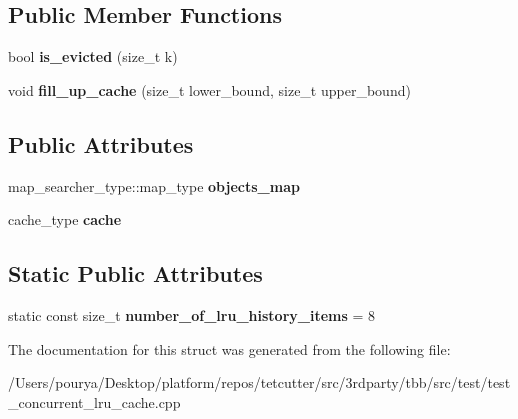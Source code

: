 \subsection*{Public Member Functions}
\begin{DoxyCompactItemize}
\item 
\hypertarget{structserial__tests_1_1usability_1_1filled__instance__counting__fixture__with__external__map_a560c03d85e4dfa7a59f0f4043d92995e}{}bool {\bfseries is\+\_\+evicted} (size\+\_\+t k)\label{structserial__tests_1_1usability_1_1filled__instance__counting__fixture__with__external__map_a560c03d85e4dfa7a59f0f4043d92995e}

\item 
\hypertarget{structserial__tests_1_1usability_1_1filled__instance__counting__fixture__with__external__map_ae0723987b2024cda6e3bf31bc3012bf7}{}void {\bfseries fill\+\_\+up\+\_\+cache} (size\+\_\+t lower\+\_\+bound, size\+\_\+t upper\+\_\+bound)\label{structserial__tests_1_1usability_1_1filled__instance__counting__fixture__with__external__map_ae0723987b2024cda6e3bf31bc3012bf7}

\end{DoxyCompactItemize}
\subsection*{Public Attributes}
\begin{DoxyCompactItemize}
\item 
\hypertarget{structserial__tests_1_1usability_1_1filled__instance__counting__fixture__with__external__map_a8fb4e3a74193224387ab87a3224a1ede}{}map\+\_\+searcher\+\_\+type\+::map\+\_\+type {\bfseries objects\+\_\+map}\label{structserial__tests_1_1usability_1_1filled__instance__counting__fixture__with__external__map_a8fb4e3a74193224387ab87a3224a1ede}

\item 
\hypertarget{structserial__tests_1_1usability_1_1filled__instance__counting__fixture__with__external__map_a1c95856edf4a0c26bf0eb723907b94d7}{}cache\+\_\+type {\bfseries cache}\label{structserial__tests_1_1usability_1_1filled__instance__counting__fixture__with__external__map_a1c95856edf4a0c26bf0eb723907b94d7}

\end{DoxyCompactItemize}
\subsection*{Static Public Attributes}
\begin{DoxyCompactItemize}
\item 
\hypertarget{structserial__tests_1_1usability_1_1filled__instance__counting__fixture__with__external__map_a0fb097da909e1b1583a12e87202d64ca}{}static const size\+\_\+t {\bfseries number\+\_\+of\+\_\+lru\+\_\+history\+\_\+items} = 8\label{structserial__tests_1_1usability_1_1filled__instance__counting__fixture__with__external__map_a0fb097da909e1b1583a12e87202d64ca}

\end{DoxyCompactItemize}


The documentation for this struct was generated from the following file\+:\begin{DoxyCompactItemize}
\item 
/\+Users/pourya/\+Desktop/platform/repos/tetcutter/src/3rdparty/tbb/src/test/test\+\_\+concurrent\+\_\+lru\+\_\+cache.\+cpp\end{DoxyCompactItemize}
